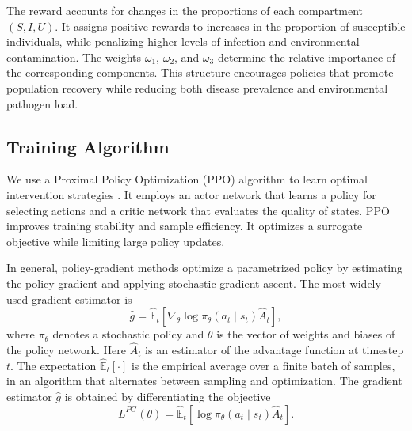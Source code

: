 \documentclass[12pt,a4paper,reqno]{amsart}
\theoremstyle{definition}
\theoremstyle{remark}
\theoremstyle{plain}
\begin{document}
The reward accounts for changes in the proportions of each compartment $(S, I, U)$. It assigns positive rewards to increases in the proportion of susceptible individuals, while penalizing higher levels of infection and environmental contamination. The weights $\omega_1$, $\omega_2$, and $\omega_3$ determine the relative importance of the corresponding components. This structure encourages policies that promote population recovery while reducing both disease prevalence and environmental pathogen load.

\subsection{Training Algorithm}

We use a Proximal Policy Optimization (PPO) algorithm to learn optimal intervention strategies \cite{schulman2017proximal}. It employs an actor network that learns a policy for selecting actions and a critic network that evaluates the quality of states. PPO improves training stability and sample efficiency. It optimizes a surrogate objective while limiting large policy updates.

In general, policy-gradient methods optimize a parametrized policy by estimating the policy gradient and applying stochastic gradient ascent. The most widely used gradient estimator is
\begin{equation}
\hat{g} = \hat{\mathbb{E}}_t \left[ \nabla_{\theta} \log \pi_{\theta}(a_t \mid s_t)\hat{A}_t \right],
\end{equation}
where $\pi_{\theta}$ denotes a stochastic policy and $\theta$ is the vector of weights and biases of the policy network. Here $\hat{A}_t$ is an estimator of the advantage function at timestep $t$. The expectation $\hat{\mathbb{E}}_t[\cdot]$ is the empirical average over a finite batch of samples, in an algorithm that alternates between sampling and optimization. The gradient estimator $\hat{g}$ is obtained by differentiating the objective
\begin{equation}
L^{PG}(\theta) = \hat{\mathbb{E}}_t \left[ \log \pi_{\theta}(a_t \mid s_t)\hat{A}_t \right].
\end{equation}
\end{document}
